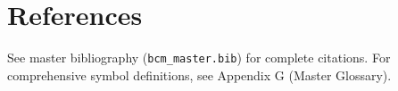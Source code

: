 \section{References}
\label{sec:dx-references}

\nocite{bcm_master}
See master bibliography (\texttt{bcm\_master.bib}) for complete citations.
For comprehensive symbol definitions, see Appendix G (Master Glossary).



